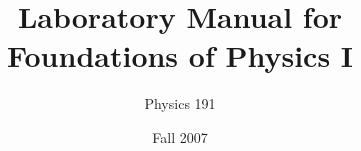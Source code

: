\documentclass[11pt,twoside]{report}
\title{{\Huge {\bf Laboratory Manual for \\ Foundations of Physics I}}}
\author{{\LARGE Physics 191}}
\date{{\Large Fall 2007}}
\begin{document}
\maketitle
\tableofcontents
\setcounter{chapter}{-1}
\newcommand{\newname}{Introduction}

\renewcommand{\newname}{Data Analysis}

\renewcommand{\newname}{Freely Falling Body}

\renewcommand{\newname}{Reaction Time and Falling Bodies} \label{exp:react}
 
\renewcommand{\newname}{Projectile Motion}

\renewcommand{\newname}{Atwood Machine}

\renewcommand{\newname}{Kinetic Friction}

\renewcommand{\newname}{Ballistic Pendulum}

\renewcommand{\newname}{Two-Body Collisions}

%
\renewcommand{\newname}{Rotational Dynamics}

\renewcommand{\newname}{Lab Practical Exam}

\renewcommand{\newname}{Simple Harmonic Motion}

\renewcommand{\newname}{The Pendulum}

%
\appendix
\renewcommand{\newname}{APPENDIX A---Error Analysis}

\renewcommand{\newname}{APPENDIX B---Tables and Graphs}

\renewcommand{\newname}{APPENDIX C---Graphical Analysis and Functional Forms}

\renewcommand{\newname}{APPENDIX D---Computer Assisted Curve Fitting}

\renewcommand{\newname}{APPENDIX E---Uncertainty Formulae}


\mbox{}


\mbox{}
\end{document}
